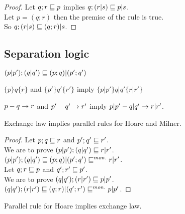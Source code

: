 \documentclass{article}
\begin{document}
\verified

\begin{proof}
Let $q; r \sqsubseteq p$ implies $q; (r | s) \sqsubseteq p | s$.\\
Let $p = (q; r)$ then the premise of the rule is true.\\
So $q; (r | s) \sqsubseteq (q; r) | s$.
\end{proof}

\subsection*{Separation logic}

\begin{axiom}
\end{axiom}

\begin{law}[Exchange]
$(p|p');(q|q') \sqsubseteq (p;q)|(p';q')$
\end{law}

\begin{rul}
$\{p\}q\{r\}$ and $\{p'\}q'\{r'\}$ imply $\{p|p'\} q|q' \{r|r'\}$
\end{rul}

\begin{rul}
$p-q\rightarrow r$ and $p'-q'\rightarrow r'$ imply $p | p'-q | q'\rightarrow r | r'$.
\end{rul}

\begin{theorem}
Exchange law implies parallel rules for Hoare and Milner.
\end{theorem}

\verified

\begin{proof}
Let $p; q \sqsubseteq r$ and $p'; q' \sqsubseteq r'$.\\
We are to prove $(p | p'); (q | q') \sqsubseteq r | r'$.\\
$(p | p'); (q | q') \sqsubseteq (p; q) | (p'; q') \sqsubseteq^{mon.} r | r'$.\\
Let $q; r \sqsubseteq p$ and $q'; r' \sqsubseteq p'$.\\
We are to prove $(q | q'); (r | r') \sqsubseteq p | p'$.\\
$(q | q'); (r | r') \sqsubseteq (q; r) | (q'; r') \sqsubseteq^{mon.} p | p'$.
\end{proof}

\begin{theorem}
Parallel rule for Hoare implies exchange law.
\end{theorem}
\end{document}
